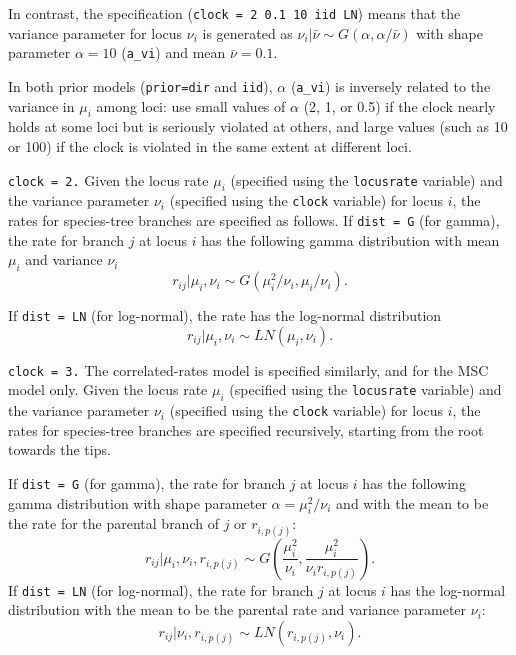 \documentclass{book}
\numberwithin{equation}{section} \renewcommand{\baselinestretch}{0.55}
\begin{document}
In contrast, the specification (\texttt{clock = 2 0.1 10 iid LN})
means that the variance parameter for locus $\nu_i$ is generated as
$\nu_i|\bar\nu \sim G(\alpha, \alpha/\bar\nu)$ with shape parameter
$\alpha = 10$ (\texttt{a\_vi}) and mean $\bar\nu = 0.1$.

In both prior models (\texttt{prior=dir} and \texttt{iid}), $\alpha$
(\texttt{a\_vi}) is inversely related to the variance in $\mu_i$ among
loci: use small values of $\alpha$ (2, 1, or 0.5) if the clock nearly
holds at some loci but is seriously violated at others, and large
values (such as 10 or 100) if the clock is violated in the same extent
at different loci.

\texttt{clock = 2.} Given the locus rate $\mu_i$ (specified using the
\texttt{locusrate} variable) and the variance parameter $\nu_i$
(specified using the \texttt{clock} variable) for locus $i$, the rates
for species-tree branches are specified as follows.  If \texttt{dist =
  G} (for gamma), the rate for branch $j$ at locus $i$ has the
following gamma distribution with mean $\mu_i$ and variance $\nu_i$
\begin{equation*}
  r_{ij} | \mu_i, \nu_i \sim G(\mu_i^2/\nu_i, \mu_i/\nu_i).
\end{equation*}

If \texttt{dist = LN} (for log-normal), the rate has the log-normal
distribution
\begin{equation*}
  r_{ij} | \mu_i, \nu_i \sim LN(\mu_i, \nu_i).
\end{equation*}

\texttt{clock = 3.}  The correlated-rates model is specified
similarly, and for the MSC model only.  Given the locus rate $\mu_i$
(specified using the \texttt{locusrate} variable) and the variance
parameter $\nu_i$ (specified using the \texttt{clock} variable) for
locus $i$, the rates for species-tree branches are specified
recursively, starting from the root towards the tips.

If \texttt{dist = G} (for gamma), the rate for branch $j$ at locus $i$
has the following gamma distribution with shape parameter
$\alpha = \mu_i^2/\nu_i$ and with the mean to be the rate for the
parental branch of $j$ or $r_{i,p(j)}$:
\begin{equation*}
  r_{ij} | \mu_i, \nu_i, r_{i,p(j)} \sim G(\frac{\mu_i^2}{\nu_i}, \frac{\mu_i^2}{\nu_i r_{i,p(j)}}).
\end{equation*}
If \texttt{dist = LN} (for log-normal), the rate for branch $j$ at
locus $i$ has the log-normal distribution with the mean to be the
parental rate and variance parameter $\nu_i$:
\begin{equation*}
  r_{ij} | \nu_i, r_{i,p(j)} \sim LN(r_{i,p(j)}, \nu_i).
\end{equation*}
\end{document}
